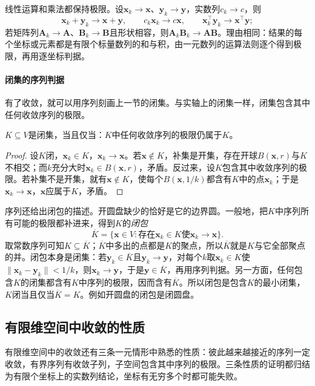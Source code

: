 线性运算和乘法都保持极限。设$\bm x_k\to\bm x$、$\bm y_k\to\bm y$，实数列$c_k\to c$，则
\[
 \bm x_k+\bm y_k\to\bm x+\bm y,\qquad c_k\bm x_k\to c\bm x,\qquad\bm x_k^\top\bm y_k\to\bm x^\top\bm y;
\]
若矩阵列$\bm A_k\to\bm A$、$\bm B_k\to\bm B$且形状相容，则$\bm A_k\bm B_k\to\bm A\bm B$。理由相同：结果的每个坐标或元素都是有限个标量数列的和与积，由一元数列的运算法则逐个得到极限，再用逐坐标判据。

\paragraph{闭集的序列判据}
有了收敛，就可以用序列刻画上一节的闭集。与实轴上的闭集一样，闭集包含其中任何收敛序列的极限。
\begin{lemma}[闭集的序列判据]
\label{lem:multivariable-closed-sequence}
$K\subseteq V$是闭集，当且仅当：$K$中任何收敛序列的极限仍属于$K$。
\end{lemma}
\begin{proof}
设$K$闭，$\bm x_k\in K$，$\bm x_k\to\bm x$。若$\bm x\notin K$，补集是开集，存在开球$B(\bm x,r)$与$K$不相交；而$k$充分大时$\bm x_k\in B(\bm x,r)$，矛盾。反过来，设$K$包含其中收敛序列的极限。若补集不是开集，就有$\bm x\notin K$，使每个$B(\bm x,1/k)$都含有$K$中的点$\bm x_k$；于是$\bm x_k\to\bm x$，$\bm x$应属于$K$，矛盾。
\end{proof}

序列还给出闭包的描述。开圆盘缺少的恰好是它的边界圆。一般地，把$K$中序列所有可能的极限都补进来，得到$K$的\emph{闭包}
\[
 \overline K=\{\bm x\in V:\text{存在}\bm x_k\in K\text{使}\bm x_k\to\bm x\}.
\]
取常数序列可知$K\subseteq\overline K$；$\overline K$中多出的点都是$K$的聚点，所以$\overline K$就是$K$与它全部聚点的并。闭包本身是闭集：若$\bm y_k\in\overline K$且$\bm y_k\to\bm y$，对每个$k$取$\bm x_k\in K$使$\lVert\bm x_k-\bm y_k\rVert<1/k$，则$\bm x_k\to\bm y$，于是$\bm y\in\overline K$，再用序列判据。另一方面，任何包含$K$的闭集都含有$K$中序列的极限，因而含有$\overline K$。所以闭包是包含$K$的最小闭集，$K$闭当且仅当$\overline K=K$。例如开圆盘的闭包是闭圆盘。

\subsection{有限维空间中收敛的性质}
\label{sec:ls-finite-dimensional-convergence-properties}

有限维空间中的收敛还有三条一元情形中熟悉的性质：彼此越来越接近的序列一定收敛，有界序列有收敛子列，子空间包含其中序列的极限。三条性质的证明都归结为有限个坐标上的实数列结论，坐标有无穷多个时都可能失败。

